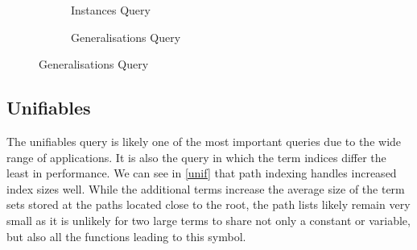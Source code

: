 \begin{figure}[h]
  \begin{subfigure}{0.45\textwidth}
\begin{adjustbox}{width=1\textwidth}
\end{adjustbox}
\caption{Instances Query}
\label{inst}
\end{subfigure}
\begin{subfigure}{0.1\textwidth}
\end{subfigure}
\begin{subfigure}{0.45\textwidth}
\begin{adjustbox}{width=1\textwidth}
\end{adjustbox}
\caption{Generalisations Query}
\label{gener}
\end{subfigure}
\end{figure}

\subsection{Unifiables}
The unifiables query is likely one of the most important queries due to the wide range of applications. It is also the query in which the term indices differ the least in performance. We can see in \cref{unif} that path indexing handles increased index sizes well. While the additional terms increase the average size of the term sets stored at the paths located close to the root, the path lists likely remain very small as it is unlikely for two large terms to share not only a constant or variable, but also all the functions leading to this symbol.

